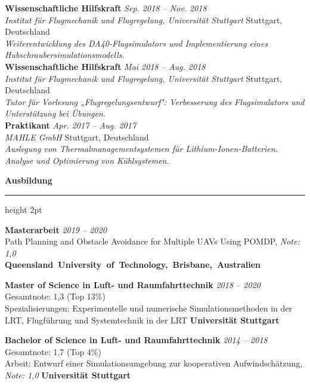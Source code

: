 \documentclass[11pt,a4paper]{article}
\newcommand{\sectiontitle}[1]{%
    \vspace{6pt}
    {\Large\bfseries\color{darkblue}#1}
    \nopagebreak
    \vspace{3pt}
    {\color{accentgreen}\hrule height 2pt}
    \vspace{4pt}
}
\newcommand{\jobtitle}[5]{%
    \textbf{#1} \hfill \textit{\small #2}\\
    {\color{darkblue}\textit{#3}} \hfill {\small #4}\\
    \textit{#5}\\[8pt]
}
\newcommand{\degreeline}[4]{%
    \textbf{#1} \hfill \textit{\small #2}\\
    {\small #3} \hfill {\color{darkblue}\textbf{#4}}\\[3pt]
}
\begin{document}
\jobtitle{Wissenschaftliche Hilfskraft}{Sep. 2018 -- Nov. 2018}{Institut für Flugmechanik und Flugregelung, Universität Stuttgart}{Stuttgart, Deutschland}{Weiterentwicklung des DA40-Flugsimulators und Implementierung eines Hubschraubersimulationsmodells.}


\jobtitle{Wissenschaftliche Hilfskraft}{Mai 2018 -- Aug. 2018}{Institut für Flugmechanik und Flugregelung, Universität Stuttgart}{Stuttgart, Deutschland}{Tutor für Vorlesung „Flugregelungsentwurf": Verbesserung des Flugsimulators und Unterstützung bei Übungen.}



\jobtitle{Praktikant}{Apr. 2017 -- Aug. 2017}{MAHLE GmbH}{Stuttgart, Deutschland}{Auslegung von Thermalmanagementsystemen für Lithium-Ionen-Batterien. Analyse und Optimierung von Kühlsystemen.}




\newpage

\sectiontitle{Ausbildung}

\degreeline{Masterarbeit}{2019 -- 2020}{Path Planning and Obstacle Avoidance for Multiple UAVs Using POMDP, \textit{Note: 1,0} \\ }{\qquad \qquad \qquad \qquad \qquad \quad \qquad \qquad \qquad \qquad \mbox{Queensland University of Technology, Brisbane, Australien}}

\vspace{5pt}

\degreeline{Master of Science in Luft- und Raumfahrttechnik}{2018 -- 2020}{Gesamtnote: 1,3 (Top 13\%) \\Spezialisierungen: Experimentelle und numerische Simulationsmethoden in der LRT, Flugführung und Systemtechnik in der LRT\phantom{very long thesis description text to balance the alignment}}{Universität Stuttgart}

\vspace{5pt}

\degreeline{Bachelor of Science in Luft- und Raumfahrttechnik}{2014 -- 2018}{Gesamtnote: 1,7 (Top 4\%) \\Arbeit: Entwurf einer Simulationsumgebung zur kooperativen Aufwindschätzung, \textit{Note: 1,0}}{Universität Stuttgart}
\end{document}
